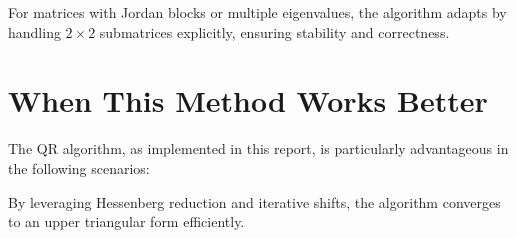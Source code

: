 \documentclass[12pt]{article}
\begin{document}
For matrices with Jordan blocks or multiple eigenvalues, the algorithm adapts by handling \(2 \times 2\) submatrices explicitly, ensuring stability and correctness.  

\section{When This Method Works Better}
The QR algorithm, as implemented in this report, is particularly advantageous in the following scenarios:  

\begin{center}
\end{center}

By leveraging Hessenberg reduction and iterative shifts, the algorithm converges to an upper triangular form efficiently.
\end{document}
